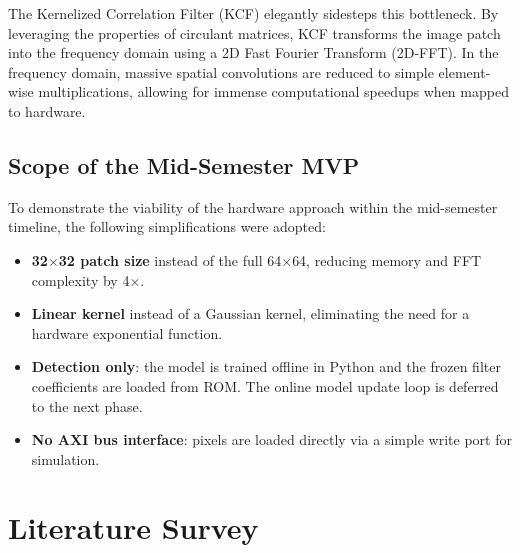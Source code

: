 \documentclass[a4paper,12pt]{report}
\begin{document}
The Kernelized Correlation Filter (KCF) \cite{henriques2015} elegantly sidesteps this bottleneck. By leveraging the properties of circulant matrices, KCF transforms the image patch into the frequency domain using a 2D Fast Fourier Transform (2D-FFT). In the frequency domain, massive spatial convolutions are reduced to simple element-wise multiplications, allowing for immense computational speedups when mapped to hardware.

\section{Scope of the Mid-Semester MVP}
To demonstrate the viability of the hardware approach within the mid-semester timeline, the following simplifications were adopted:
\begin{itemize}
    \item \textbf{32$\times$32 patch size} instead of the full 64$\times$64, reducing memory and FFT complexity by 4$\times$.
    \item \textbf{Linear kernel} instead of a Gaussian kernel, eliminating the need for a hardware exponential function.
    \item \textbf{Detection only}: the model is trained offline in Python and the frozen filter coefficients are loaded from ROM. The online model update loop is deferred to the next phase.
    \item \textbf{No AXI bus interface}: pixels are loaded directly via a simple write port for simulation.
\end{itemize}

\chapter{Literature Survey}
\end{document}

